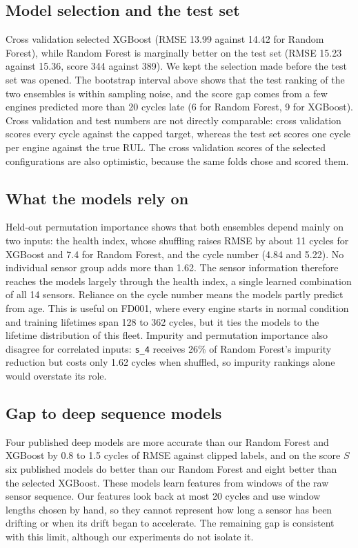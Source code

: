 \subsection{Model selection and the test set}
Cross validation selected XGBoost (RMSE 13.99 against 14.42 for Random
Forest), while Random Forest is marginally better on the test set (RMSE
15.23 against 15.36, score 344 against 389). We kept the selection made
before the test set was opened. The bootstrap interval above shows that the
test ranking of the two ensembles is within sampling noise, and the score
gap comes from a few engines predicted more than 20 cycles late (6 for
Random Forest, 9 for XGBoost). Cross validation and test numbers are not
directly comparable: cross validation scores every cycle against the
capped target, whereas the test set scores one cycle per engine against
the true RUL. The cross validation scores of the selected configurations
are also optimistic, because the same folds chose and scored them.

\subsection{What the models rely on}
Held-out permutation importance shows that both ensembles depend mainly on
two inputs: the health index, whose shuffling raises RMSE by about 11
cycles for XGBoost and 7.4 for Random Forest, and the cycle number (4.84
and 5.22). No individual sensor group adds more than 1.62. The sensor
information therefore reaches the models largely through the health index,
a single learned combination of all 14 sensors. Reliance on the cycle
number means the models partly predict from age. This is useful on FD001,
where every engine starts in normal condition and training lifetimes span
128 to 362 cycles, but it ties the models to the lifetime distribution of
this fleet. Impurity and permutation importance also disagree for
correlated inputs: \texttt{s\_4} receives 26\% of Random Forest's impurity
reduction but costs only 1.62 cycles when shuffled, so impurity rankings
alone would overstate its role.

\subsection{Gap to deep sequence models}
Four published deep models are more accurate than our Random Forest and
XGBoost by 0.8 to 1.5 cycles of RMSE against clipped labels, and on the
score $S$ six published models do better than our Random Forest and eight
better than the selected XGBoost. These models learn
features from windows of the raw sensor sequence. Our features look back
at most 20 cycles and use window lengths chosen by hand, so they cannot
represent how long a sensor has been drifting or when its drift began to
accelerate. The remaining gap is consistent with this limit, although our
experiments do not isolate it.

